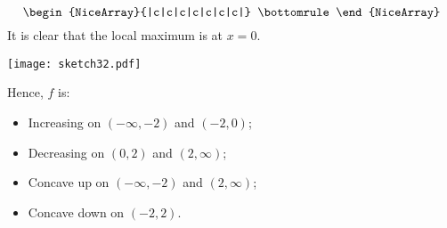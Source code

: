 \begin{Example}{}{}
\begin{enumerate}[(1)]
\[\begin{NiceArray}{|c|c|c|c|c|c|c|}
                      \bottomrule
                  \end{NiceArray} \]
              It is clear that the local maximum is at $ x=0 $.
    \end{enumerate}
    \begin{center}
        \texttt{[image: sketch32.pdf]}
    \end{center}
    Hence, $ f $ is:
    \begin{itemize}
        \item Increasing on $ (-\infty,-2) $ and $ (-2,0) $;
        \item Decreasing on $ (0,2) $ and $ (2,\infty) $;
        \item Concave up on $ (-\infty,-2) $ and $ (2,\infty) $;
        \item Concave down on $ (-2,2) $.
    \end{itemize}
\end{Example}